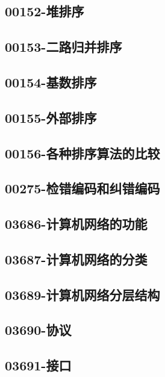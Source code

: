 \subsection{00152-堆排序}

\subsection{00153-二路归并排序}

\subsection{00154-基数排序}

\subsection{00155-外部排序}

\subsection{00156-各种排序算法的比较}

\subsection{00275-检错编码和纠错编码}

\subsection{03686-计算机网络的功能}

\subsection{03687-计算机网络的分类}

\subsection{03689-计算机网络分层结构}

\subsection{03690-协议}

\subsection{03691-接口}

